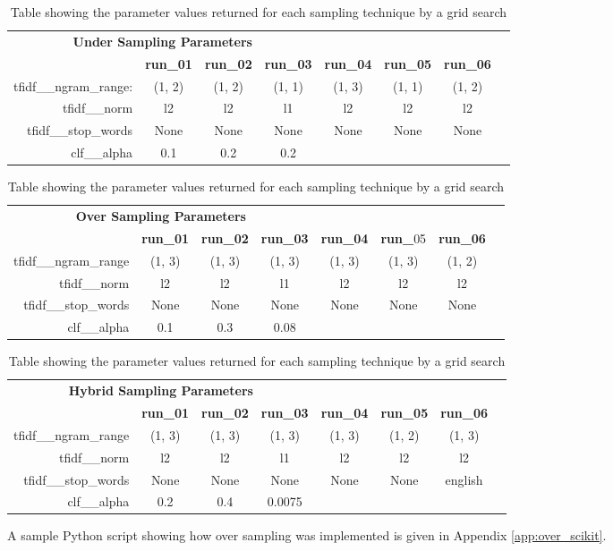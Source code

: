\begin{table}[h]
\centering
\caption[Sampling parameter values returned by grid search]{Table showing the parameter values returned for each sampling technique by a grid search}
\label{tab:chapter5:grid_search_parameters}

\begin{tabular}{rccccccc}
	\toprule
	\multicolumn{4}{c}{\textbf{Under Sampling Parameters}} \\
	\cmidrule(r){1-4}
	 & \textbf{run\_01} & \textbf{run\_02} & \textbf{run\_03} & \textbf{run\_04} & \textbf{run\_05} & \textbf{run\_06} \\
	\midrule
	tfidf\_\_ngram\_range: & (1, 2) & (1, 2) & (1, 1) & (1, 3) & (1, 1) & (1, 2) \\
	tfidf\_\_norm & l2 & l2 & l1 & l2 & l2 & l2 \\
	tfidf\_\_stop\_words & None & None & None & None & None & None \\
	clf\_\_alpha & 0.1 & 0.2 & 0.2 &  &  &  \\
	\bottomrule
\end{tabular}

\begin{tabular}{rccccccc}
	\multicolumn{4}{c}{\textbf{Over Sampling Parameters}} \\
	\cmidrule(r){1-4}
	 & \textbf{run\_01} & \textbf{run\_02} & \textbf{run\_03} & \textbf{run\_04} & \textbf{run\_}05 & \textbf{run\_06} \\
    \midrule
	tfidf\_\_ngram\_range & (1, 3) & (1, 3) & (1, 3) & (1, 3) & (1, 3) & (1, 2) \\
	tfidf\_\_norm & l2 & l2 & l1 & l2 & l2 & l2 \\
	tfidf\_\_stop\_words & None & None & None & None & None & None \\
	clf\_\_alpha & 0.1 & 0.3 & 0.08 &  &  &  \\    \bottomrule
\end{tabular}

\begin{tabular}{rccccccc}
	\multicolumn{4}{c}{\textbf{Hybrid Sampling Parameters}} \\
	\cmidrule(r){1-4}
	 & \textbf{run\_01} & \textbf{run\_02} & \textbf{run\_03} & \textbf{run\_04} & \textbf{run\_05} & \textbf{run\_06} \\
	\midrule
	tfidf\_\_ngram\_range & (1, 3) & (1, 3) & (1, 3) & (1, 3) & (1, 2) & (1, 3) \\
	tfidf\_\_norm & l2 & l2 & l1 & l2 & l2 & l2 \\
	tfidf\_\_stop\_words & None & None & None & None & None & english \\
	clf\_\_alpha & 0.2 & 0.4 & 0.0075 &  &  &  \\	\bottomrule
\end{tabular}
\end{table}

A sample Python script showing how over sampling was implemented is given in Appendix \ref{app:over_scikit}.

